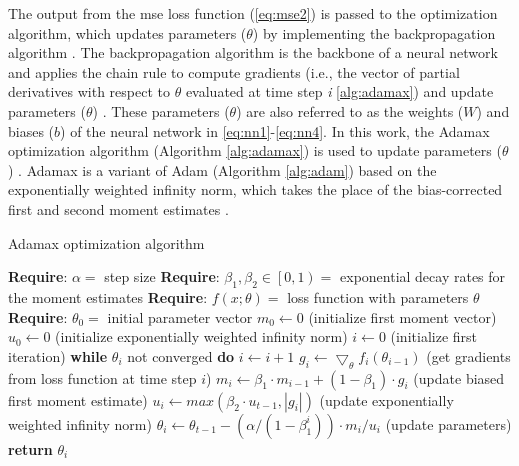 \noindent The output from the \gls{mse} loss function (\ref{eq:mse2}) is passed to the optimization algorithm, which updates parameters ($\theta$) by implementing the backpropagation algorithm \cite{goodfellow}.
The backpropagation algorithm is the backbone of a neural network and applies the chain rule to compute gradients (i.e., the vector of partial derivatives with respect to $\theta$ evaluated at time step \textit{i} \ref{alg:adamax}) and update parameters ($\theta$) \cite{goodfellow}.
These parameters ($\theta$) are also referred to as the weights ($W$) and biases ($b$) of the neural network in \ref{eq:nn1}-\ref{eq:nn4}.
In this work, the Adamax optimization algorithm (Algorithm \ref{alg:adamax}) is used to update parameters ($\theta$) \cite{kingma}.
Adamax is a variant of Adam (Algorithm \ref{alg:adam}) \cite{kingma} based on the exponentially weighted infinity norm, which takes the place of the bias-corrected first and second moment estimates \cite{kingma}.

\vspace{+0.6cm}
\begin{algorithm}[H]
  \centering
  \caption{Adamax optimization algorithm \cite{kingma}}
  \label{alg:adamax}
  \begin{algorithmic}
    \STATE \textbf{Require}: $\alpha = $ step size
    \STATE \textbf{Require}: $\beta_{1}, \beta_{2} \in \left[ 0, 1 \right) = $ exponential decay rates for the moment estimates
    \STATE \textbf{Require}: $f(x; \theta) = $ loss function with parameters $\theta$
    \STATE \textbf{Require}: $\theta_{0} = $ initial parameter vector
    \STATE $m_{0} \leftarrow 0$ (initialize first moment vector)
    \STATE $u_{0} \leftarrow 0$ (initialize exponentially weighted infinity norm)
    \STATE $i \leftarrow 0$ (initialize first iteration)
    \STATE \textbf{while} $\theta_{i}$ not converged \textbf{do}
    \STATE \hspace{\algorithmicindent} $i \leftarrow i + 1$
    \STATE \hspace{\algorithmicindent} $g_{i} \leftarrow \bigtriangledown_{\theta} f_{i} (\theta_{i - 1})$ (get gradients from loss function at time step $i$)
    \STATE \hspace{\algorithmicindent} $m_{i} \leftarrow \beta_{1} \cdot m_{i - 1} + (1 - \beta_{1}) \cdot g_{i}$ (update biased first moment estimate)
    \STATE \hspace{\algorithmicindent} $u_{i} \leftarrow max(\beta_{2} \cdot u_{t - 1}, |g_{i}|)$ (update exponentially weighted infinity norm)
    \STATE \hspace{\algorithmicindent} $\theta_{i} \leftarrow \theta_{t - 1} - (\alpha / (1 - \beta_{1}^{i})) \cdot m_{i} / u_{i}$ (update parameters)
    \STATE \textbf{return} $\theta_{i}$
  \end{algorithmic}
\end{algorithm}

